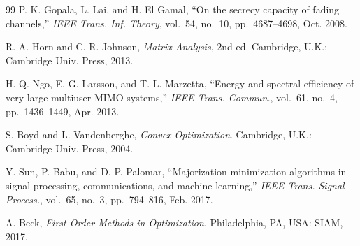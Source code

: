 \documentclass[journal]{IEEEtran}
\begin{document}
\begin{thebibliography}{99}
P. K. Gopala, L. Lai, and H. El Gamal, ``On the secrecy capacity of fading channels,'' \emph{IEEE Trans. Inf. Theory}, vol.~54, no.~10, pp.~4687--4698, Oct. 2008.

R. A. Horn and C. R. Johnson, \emph{Matrix Analysis}, 2nd ed. Cambridge, U.K.: Cambridge Univ. Press, 2013.

H. Q. Ngo, E. G. Larsson, and T. L. Marzetta, ``Energy and spectral efficiency of very large multiuser MIMO systems,'' \emph{IEEE Trans. Commun.}, vol.~61, no.~4, pp.~1436--1449, Apr. 2013.

S. Boyd and L. Vandenberghe, \emph{Convex Optimization}. Cambridge, U.K.: Cambridge Univ. Press, 2004.

Y. Sun, P. Babu, and D. P. Palomar, ``Majorization-minimization algorithms in signal processing, communications, and machine learning,'' \emph{IEEE Trans. Signal Process.}, vol.~65, no.~3, pp.~794--816, Feb. 2017.

A. Beck, \emph{First-Order Methods in Optimization}. Philadelphia, PA, USA: SIAM, 2017.

\end{thebibliography}
\end{document}
